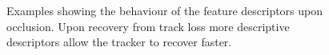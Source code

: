\begin{figure}[t]
	\vspace{2mm}
\centerline{%
	}
	\vspace{-2mm}
\centerline{%
	}
\caption{Examples showing the behaviour of the feature descriptors upon occlusion. Upon recovery from track loss more descriptive descriptors allow the tracker to recover faster.}
\vspace{-3mm}
\label{fig:tracking_results}
\end{figure}

